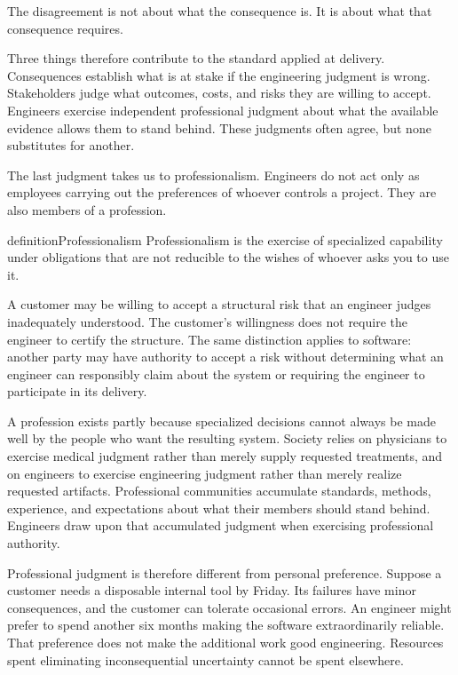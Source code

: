 The disagreement is not about what the consequence is. It is about what that consequence requires.

Three things therefore contribute to the standard applied at delivery. Consequences establish what
is at stake if the engineering judgment is wrong. Stakeholders judge what outcomes, costs, and
risks they are willing to accept. Engineers exercise independent professional judgment about what
the available evidence allows them to stand behind. These judgments often agree, but none
substitutes for another.

The last judgment takes us to professionalism. Engineers do not act only as employees carrying out
the preferences of whoever controls a project. They are also members of a profession.

\begin{bookbox}{definition}{Professionalism} %
Professionalism is the exercise of specialized capability under obligations that are not reducible
to the wishes of whoever asks you to use it.

A customer may be willing to accept a structural risk that an engineer judges inadequately
understood. The customer's willingness does not require the engineer to certify the structure. The
same distinction applies to software: another party may have authority to accept a risk without
determining what an engineer can responsibly claim about the system or requiring the engineer to
participate in its delivery.
\end{bookbox}

A profession exists partly because specialized decisions cannot always be made well by the people
who want the resulting system. Society relies on physicians to exercise medical judgment rather
than merely supply requested treatments, and on engineers to exercise engineering judgment rather
than merely realize requested artifacts. Professional communities accumulate standards, methods,
experience, and expectations about what their members should stand behind. Engineers draw upon that
accumulated judgment when exercising professional authority.

Professional judgment is therefore different from personal preference. Suppose a customer needs a
disposable internal tool by Friday. Its failures have minor consequences, and the customer can
tolerate occasional errors. An engineer might prefer to spend another six months making the
software extraordinarily reliable. That preference does not make the additional work good
engineering. Resources spent eliminating inconsequential uncertainty cannot be spent elsewhere.

